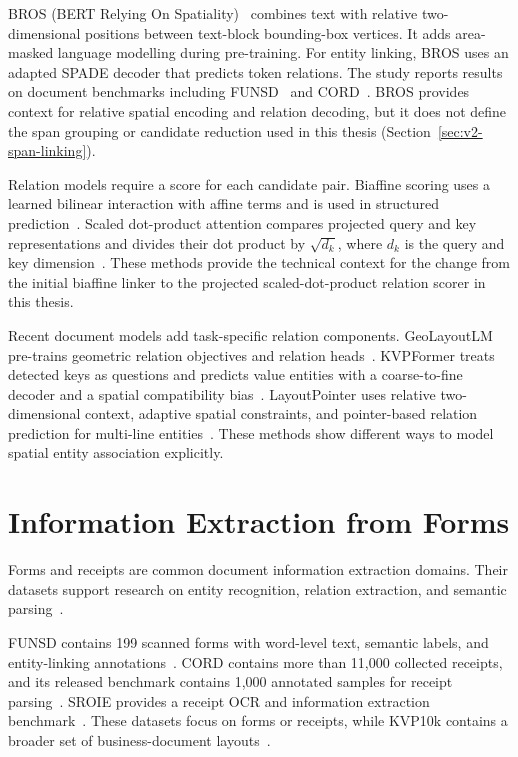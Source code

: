 BROS (BERT Relying On Spatiality)~\cite{bros} combines text with relative
two-dimensional positions between text-block bounding-box vertices. It adds
area-masked language modelling during pre-training. For entity linking, BROS
uses an adapted SPADE decoder that predicts token relations. The study reports
results on document benchmarks including FUNSD~\cite{funsd} and
CORD~\cite{cord}. BROS provides context for relative spatial encoding and
relation decoding, but it does not define the span grouping or candidate
reduction used in this thesis (Section~\ref{sec:v2-span-linking}).

Relation models require a score for each candidate pair. Biaffine scoring uses
a learned bilinear interaction with affine terms and is used in structured
prediction~\cite{dozat2017biaffine}. Scaled dot-product attention compares
projected query and key representations and divides their dot product by
$\sqrt{d_k}$, where $d_k$ is the query and key
dimension~\cite{vaswani2017attention}. These methods provide the technical
context for the change from the initial biaffine linker to the projected
scaled-dot-product relation scorer in this thesis.

Recent document models add task-specific relation components. GeoLayoutLM
pre-trains geometric relation objectives and relation heads~\cite{geolayoutlm}.
KVPFormer treats detected keys as questions and predicts value entities with a
coarse-to-fine decoder and a spatial compatibility bias~\cite{kvpformer}.
LayoutPointer uses relative two-dimensional context, adaptive spatial
constraints, and pointer-based relation prediction for multi-line
entities~\cite{layoutpointer}. These methods show different ways to model
spatial entity association explicitly.

\section{Information Extraction from Forms}
\label{sec:form_extraction}

Forms and receipts are common document information extraction domains. Their
datasets support research on entity recognition, relation extraction, and
semantic parsing~\cite{funsd,cord,sroie}.

FUNSD contains 199 scanned forms with word-level text, semantic labels, and
entity-linking annotations~\cite{funsd}. CORD contains more than 11,000
collected receipts, and its released benchmark contains 1,000 annotated samples
for receipt parsing~\cite{cord}. SROIE provides a receipt OCR and information
extraction benchmark~\cite{sroie}. These datasets focus on forms or receipts,
while KVP10k contains a broader set of business-document
layouts~\cite{kvp10k}.

